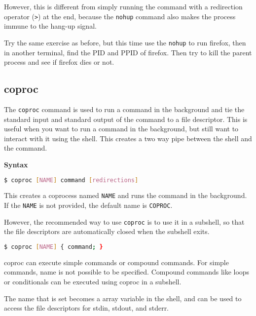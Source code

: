 However, this is different from simply running the command
with a redirection operator (\lstinline|>|) at the end,
because the \lstinline|nohup| command also makes the process
immune to the hang-up signal.

\begin{exercise}
  Try the same exercise as before, but this time use the \lstinline|nohup|
  to run firefox, then in another terminal, find the PID and PPID of
  firefox. Then try to kill the parent process and see if firefox
  dies or not.
\end{exercise}

\subsection{coproc}

The \lstinline|coproc| command is used to run a command in the background
and tie the standard input and standard output of the command to a
file descriptor. This is useful when you want to run a command in the
background, but still want to interact with it using the shell.
This creates a two way pipe between the shell and the command.

\textbf{Syntax}

\begin{lstlisting}[language=bash]
$ coproc [NAME] command [redirections]
\end{lstlisting}

This creates a coprocess named \lstinline|NAME| and runs the command in the background.
If the \lstinline|NAME| is not provided, the default name is \lstinline|COPROC|.

However, the recommended way to use \lstinline|coproc| is to use it in a
subshell, so that the file descriptors are automatically closed when
the subshell exits.

\begin{lstlisting}[language=bash]
$ coproc [NAME] { command; }
\end{lstlisting}

coproc can execute simple commands or compound commands. For simple
commands, name is not possible to be specified. Compound commands like
loops or conditionals can be executed using coproc in a subshell.

The name that is set becomes a array variable in the shell, and can be used
to access the file descriptors for stdin, stdout, and stderr.

